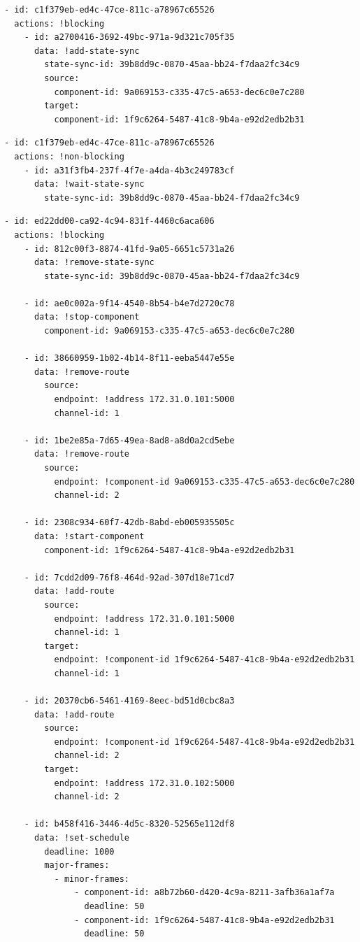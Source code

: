 \begin{lstlisting}[caption=Demonstration configuration 2 task B (Yaml), label={lst:configDemonstration2b},captionpos=b]
- id: c1f379eb-ed4c-47ce-811c-a78967c65526
  actions: !blocking
    - id: a2700416-3692-49bc-971a-9d321c705f35
      data: !add-state-sync
        state-sync-id: 39b8dd9c-0870-45aa-bb24-f7daa2fc34c9
        source:
          component-id: 9a069153-c335-47c5-a653-dec6c0e7c280
        target:
          component-id: 1f9c6264-5487-41c8-9b4a-e92d2edb2b31
\end{lstlisting}

\begin{lstlisting}[caption=Demonstration configuration 2 task C (Yaml), label={lst:configDemonstration2c},captionpos=b]
  - id: c1f379eb-ed4c-47ce-811c-a78967c65526
  actions: !non-blocking
    - id: a31f3fb4-237f-4f7e-a4da-4b3c249783cf
      data: !wait-state-sync
        state-sync-id: 39b8dd9c-0870-45aa-bb24-f7daa2fc34c9
\end{lstlisting}

\begin{lstlisting}[caption=Demonstration configuration 2 task D (Yaml), label={lst:configDemonstration2d},captionpos=b]
- id: ed22dd00-ca92-4c94-831f-4460c6aca606
  actions: !blocking
    - id: 812c00f3-8874-41fd-9a05-6651c5731a26
      data: !remove-state-sync
        state-sync-id: 39b8dd9c-0870-45aa-bb24-f7daa2fc34c9

    - id: ae0c002a-9f14-4540-8b54-b4e7d2720c78
      data: !stop-component
        component-id: 9a069153-c335-47c5-a653-dec6c0e7c280

    - id: 38660959-1b02-4b14-8f11-eeba5447e55e
      data: !remove-route
        source:
          endpoint: !address 172.31.0.101:5000
          channel-id: 1

    - id: 1be2e85a-7d65-49ea-8ad8-a8d0a2cd5ebe
      data: !remove-route
        source:
          endpoint: !component-id 9a069153-c335-47c5-a653-dec6c0e7c280
          channel-id: 2

    - id: 2308c934-60f7-42db-8abd-eb005935505c
      data: !start-component
        component-id: 1f9c6264-5487-41c8-9b4a-e92d2edb2b31

    - id: 7cdd2d09-76f8-464d-92ad-307d18e71cd7
      data: !add-route
        source:
          endpoint: !address 172.31.0.101:5000
          channel-id: 1
        target:
          endpoint: !component-id 1f9c6264-5487-41c8-9b4a-e92d2edb2b31
          channel-id: 1

    - id: 20370cb6-5461-4169-8eec-bd51d0cbc8a3
      data: !add-route
        source:
          endpoint: !component-id 1f9c6264-5487-41c8-9b4a-e92d2edb2b31
          channel-id: 2
        target:
          endpoint: !address 172.31.0.102:5000
          channel-id: 2

    - id: b458f416-3446-4d5c-8320-52565e112df8
      data: !set-schedule
        deadline: 1000
        major-frames:
          - minor-frames:
              - component-id: a8b72b60-d420-4c9a-8211-3afb36a1af7a
                deadline: 50
              - component-id: 1f9c6264-5487-41c8-9b4a-e92d2edb2b31
                deadline: 50
\end{lstlisting}

